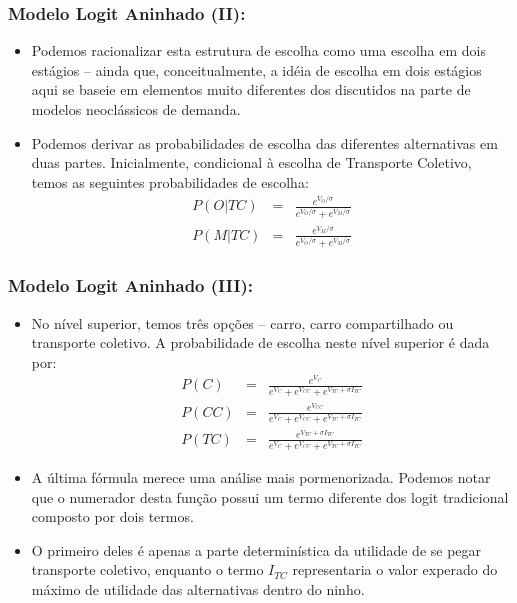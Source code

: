 \documentclass{beamer}
\begin{document}
\begin{frame}\frametitle{Modelo Logit Aninhado (II):}

\begin{itemize}
\item Podemos racionalizar esta estrutura de escolha como uma escolha em
dois estágios -- ainda que, conceitualmente, a idéia de
escolha em dois estágios aqui se baseie em elementos muito diferentes
dos discutidos na parte de modelos neoclássicos de demanda.
\item Podemos derivar as probabilidades de escolha das diferentes alternativas
em duas partes. Inicialmente, condicional à escolha de Transporte
Coletivo, temos as seguintes probabilidades de escolha:
\begin{eqnarray*}
P(O|TC) & = & \frac{e^{V_{O}/\sigma}}{e^{V_{O}/\sigma}+e^{V_{M}/\sigma}}\\
P(M|TC) & = & \frac{e^{V_{M}/\sigma}}{e^{V_{O}/\sigma}+e^{V_{M}/\sigma}}
\end{eqnarray*}
\end{itemize}
\end{frame}

\begin{frame}\frametitle{Modelo Logit Aninhado (III):}

\begin{itemize}
\item No nível superior, temos três opções -- carro, carro compartilhado
ou transporte coletivo. A probabilidade de escolha neste nível superior
é dada por:
\begin{eqnarray*}
P(C) & = & \frac{e^{V_{C}}}{e^{V_{C}}+e^{V_{CC}}+e^{V_{TC}+\sigma I_{TC}}}\\
P(CC) & = & \frac{e^{V_{CC}}}{e^{V_{C}}+e^{V_{CC}}+e^{V_{TC}+\sigma I_{TC}}}\\
P(TC) & = & \frac{e^{V_{TC}+\sigma I_{TC}}}{e^{V_{C}}+e^{V_{CC}}+e^{V_{TC}+\sigma I_{TC}}}
\end{eqnarray*}
\item A última fórmula merece uma análise mais pormenorizada. Podemos notar
que o numerador desta função possui um termo diferente dos logit tradicional
composto por dois termos. 
\item O primeiro deles é apenas a parte determinística da utilidade de se
pegar transporte coletivo, enquanto o termo $I_{TC}$ representaria
o valor experado do máximo de utilidade das alternativas dentro do
ninho. 
\end{itemize}
\end{frame}
\end{document}
